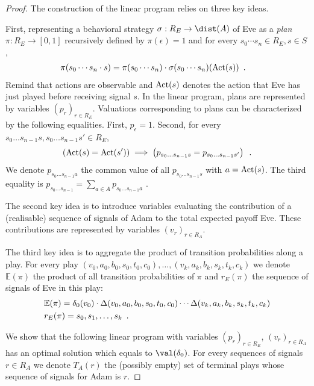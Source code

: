 \begin{proof}
The construction of the linear program relies on three key ideas.

First, representing a behavioral strategy $\sigma:R_E \to \dist(A)$
 of Eve as a \emph{plan} $\pi:R_E  \to [0,1]$
 recursively defined by $\pi(\epsilon) = 1$
 and for every $s_0\cdots s_n \in R_E, s\in S$,
 \begin{align*}
& \pi(s_0\cdots s_n\cdot s) = \pi(s_0\cdots s_n) \cdot
 \sigma(s_0\cdots s_n)(\text{Act}(s))\enspace.
 \end{align*}
Remind that actions are observable and $\text{Act}(s)$
denotes the action that Eve has just played
before receiving signal $s$.
In the linear program, plans are represented by variables 
$\left(p_r\right)_{r \in R_E}$. 
Valuations corresponding to plans can be characterized by 
the following equalities.
First, $p_\epsilon = 1$.
Second, for every 
$s_0\ldots s_{n-1}s,s_0\ldots s_{n-1}s' \in R_E$,
\begin{align*}
(\text{Act}(s)=\text{Act}(s')) \implies \left(p_{s_0\ldots s_{n-1}s}= p_{s_0\ldots s_{n-1}s'}\right)\enspace.
\end{align*}
We denote $p_{s_0\ldots s_{n-1}a}$ the common value of
all $p_{s_0\ldots s_{n-1}s}$ with $a=\text{Act}(s)$.
The third equality is 
$p_{s_0\ldots s_{n-1}}=\sum_{a\in A} p_{s_0\ldots s_{n-1}a}$ \enspace.

 The second key idea is to introduce variables evaluating the contribution of a 
 (realisable) sequence
 of signals of Adam to the total expected payoff Eve.
 These contributions are represented by variables $(v_r)_{r \in R_A}$.
 
 The third key idea is to aggregate the product of transition
 probabilities along a play.
For every play $(v_0,a_0,b_0,s_0,t_0,c_0),\ldots,(v_k,a_k,b_k,s_k,t_k,c_k)$
 we denote $\mathbb{E}(\pi)$ the product of all transition
probabilities of $\pi$ and $r_{E}(\pi)$ the sequence of signals of Eve in this play:
\begin{align*}
&\mathbb{E}(\pi) = \delta_0(v_0)\cdot \Delta(v_0,a_0,b_0,s_0,t_0,c_0)
  \cdots \Delta(v_k,a_k,b_k,s_k,t_k,c_k)\\
 & r_{E}(\pi) = s_0,s_1,\ldots,s_k\enspace.
\end{align*}
 
  
We show that the following linear program with variables
  $(p_r)_{r \in R_E}$, $(v_r)_{r\in R_A}$
  has an optimal solution which equals to $\val(\ini)$.
 For every sequences of signals $r \in R_A$
 we denote $T_A(r)$ the (possibly empty)
 set of terminal plays whose sequence of signals for Adam is $r$.


\end{proof}
